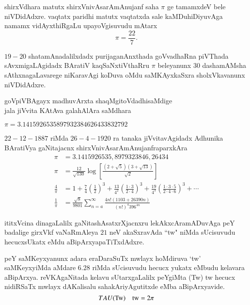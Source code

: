 shirxVdhara matutx shirxVnivAsarAmAnujanf saha $\pi$ ge tamamxdeV bele niVDidAdxre. vaqtatx paridhi matutx vaqtatxda sale kaMDuhiDiyuvAga namamx vidAyxthiRgaLu upayoVgisuvudu mAtarx
$$
\pi = \frac{22}{7}.
$$

$19-20$ shatamAnadalilxdadx purijaganAnxthada goVvadhaRna piVThada sAvxmigaLAgidadx BAratiV kaqSaNxtiVthaRru $\pi$ beleyanunx $30$ dashamAMsha sAthxnagaLavarege niKaravAgi koDuva oMdu saMKAyxkaSxra sholxVkavanunx niVDidAdxre. 
\begin{center}
goVpiVBAgayx madhuvArxta shaqMgitoVdadhisaMdige\\
jala jiVvita KAtAva galahAlAra saMdhara
\end{center}

$\pi = 3.1415926535897932384626433832792$

\vfill\eject
$22-12-1887$ riMda $26-4-1920$ ra tanaka jiVvitavAgidadx Adhunika BAratiVya gaNitajacnx             \;shirxVnivAsarAmAnujanfraparxkAra
\begin{align*}
\pi &= 3.1415926535,8979323846,26434\\
\pi &= \frac{12}{\sqrt{130}}\log\left[\frac{{(2+\sqrt{5})}{(3+\sqrt{13})}}{\sqrt{2}}\right]\\
\frac{4}{\pi} &= 1 + \frac{7}{4}\left(\frac{1}{2}\right)^3 + \frac{13}{4^{2}}\left(\frac{1 \cdot 3}{2 \cdot 4}\right)^3 + \frac{19}{4^{3}}\left(\frac{1 \cdot 3 \cdot 5}{2 \cdot 4 \cdot 6}\right)^3 +\cdots\\
\frac{1}{\pi} &= \frac{\sqrt{8}}{9801} \sum_{n=a}^\infty \frac{4n!(1103+26390n)}{(n!)^{4}396^{4n}}
\end{align*}

ititxVcina dinagaLalilx gaNitashAsatxrXjacnxru lekAkxcAramADuvAga peY badalige girxVkf  vaNaRmAleya $21$ neV akaSxravAda ``tw" niMda sUcisuvudu hecucxsUkatx eMdu aBipArxyapaTiTxdAdxre.

peY saMKeyxyanunx adara eraDaraSuTx mwlayx hoMdiruva `tw' saMKeyxyiMda aMdare $6.28$ riMda sUcisuvudu hecucx yukatx eMbudu kelavara aBipArxya. reVKAgaNitada kelavu sUtarxgaLalilx peYgiMta (Tw) tw hecucx nidiRSaTx mwlayx dAKalisalu sahakAriyAgutitxde eMba aBipArxyavide.
$$
TAU\text{(Tw)\quad tw} = 2\pi
$$
